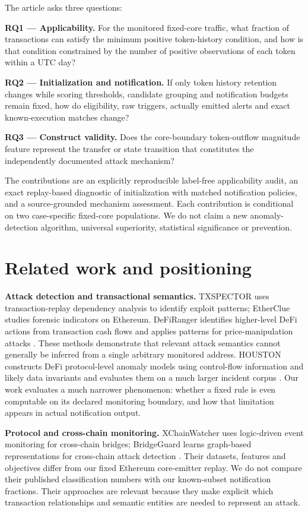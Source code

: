 \documentclass[preprint,12pt,authoryear]{elsarticle}
\begin{document}
The article asks three questions:

\textbf{RQ1 --- Applicability.} For the monitored fixed-core traffic, what fraction of transactions can satisfy the minimum positive token-history condition, and how is that condition constrained by the number of positive observations of each token within a UTC day?

\textbf{RQ2 --- Initialization and notification.} If only token history retention changes while scoring thresholds, candidate grouping and notification budgets remain fixed, how do eligibility, raw triggers, actually emitted alerts and exact known-execution matches change?

\textbf{RQ3 --- Construct validity.} Does the core-boundary token-outflow magnitude feature represent the transfer or state transition that constitutes the independently documented attack mechanism?

The contributions are an explicitly reproducible label-free applicability audit, an exact replay-based diagnostic of initialization with matched notification policies, and a source-grounded mechanism assessment. Each contribution is conditional on two case-specific fixed-core populations. We do not claim a new anomaly-detection algorithm, universal superiority, statistical significance or prevention.

\section{Related work and positioning}\label{related-work-and-positioning}

\textbf{Attack detection and transactional semantics.} TXSPECTOR uses transaction-replay dependency analysis to identify exploit patterns; EtherClue studies forensic indicators on Ethereum. DeFiRanger identifies higher-level DeFi actions from transaction cash flows and applies patterns for price-manipulation attacks \citep{Zhang2020TxSpector,Aquilina2021EtherClue,Wu2024DeFiRanger}. These methods demonstrate that relevant attack semantics cannot generally be inferred from a single arbitrary monitored address. HOUSTON constructs DeFi protocol-level anomaly models using control-flow information and likely data invariants and evaluates them on a much larger incident corpus \citep{Meng2026Houston}. Our work evaluates a much narrower phenomenon: whether a fixed rule is even computable on its declared monitoring boundary, and how that limitation appears in actual notification output.

\textbf{Protocol and cross-chain monitoring.} XChainWatcher uses logic-driven event monitoring for cross-chain bridges; BridgeGuard learns graph-based representations for cross-chain attack detection \citep{Augusto2025XChainWatcher,Wu2025BridgeGuard}. Their datasets, features and objectives differ from our fixed Ethereum core-emitter replay. We do not compare their published classification numbers with our known-subset notification fractions. Their approaches are relevant because they make explicit which transaction relationships and semantic entities are needed to represent an attack.
\end{document}
